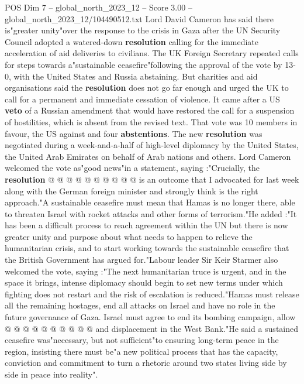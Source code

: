 \begin{textsample}{POS Dim 7 – global\_north\_2023\_12 – Score 3.00 – global\_north\_2023\_12/104490512.txt}  \label{ex:f7_pos_304}
Lord David Cameron has said there is"greater unity"over the response to the crisis in Gaza after the UN Security Council adopted a watered-down \textbf{resolution} calling for the immediate acceleration of aid deliveries to civilians.
The UK Foreign Secretary repeated calls for steps towards a"sustainable ceasefire"following the approval of the vote by 13-0, with the United States and Russia abstaining.
But charities and aid organisations said the \textbf{resolution} does not go far enough and urged the UK to call for a permanent and immediate cessation of violence.
It came after a US \textbf{veto} of a Russian amendment that would have restored the call for a suspension of hostilities, which is absent from the revised text.
That vote was 10 members in favour, the US against and four \textbf{abstentions}.
The new \textbf{resolution} was negotiated during a week-and-a-half of high-level diplomacy by the United States, the United Arab Emirates on behalf of Arab nations and others.
Lord Cameron welcomed the vote as"good news"in a statement, saying :"Crucially, the \textbf{resolution} @ @ @ @ @ @ @ @ @ @ is an outcome that I advocated for last week along with the German foreign minister and strongly think is the right approach."A sustainable ceasefire must mean that Hamas is no longer there, able to threaten Israel with rocket attacks and other forms of terrorism."He added :"It has been a difficult process to reach agreement within the UN but there is now greater unity and purpose about what needs to happen to relieve the humanitarian crisis, and to start working towards the sustainable ceasefire that the British Government has argued for."Labour leader Sir Keir Starmer also welcomed the vote, saying :"The next humanitarian truce is urgent, and in the space it brings, intense diplomacy should begin to set new terms under which fighting does not restart and the risk of escalation is reduced."Hamas must release all the remaining hostages, end all attacks on Israel and have no role in the future governance of Gaza.
Israel must agree to end its bombing campaign, allow @ @ @ @ @ @ @ @ @ @ and displacement in the West Bank."He said a sustained ceasefire was"necessary, but not sufficient"to ensuring long-term peace in the region, insisting there must be"a new political process that has the capacity, conviction and commitment to turn a rhetoric around two states living side by side in peace into reality".

\end{textsample}
